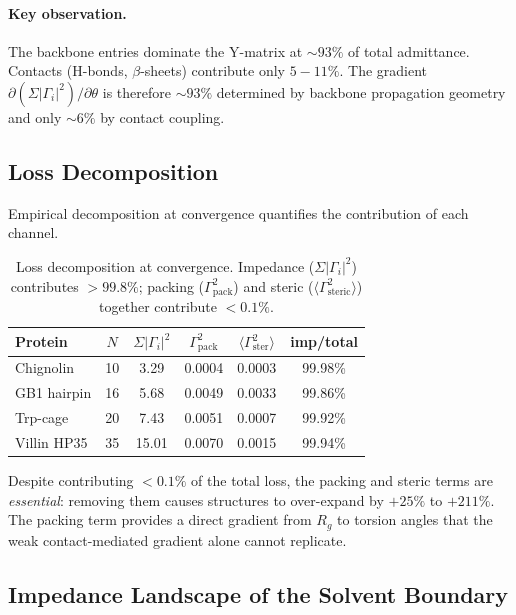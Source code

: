 \paragraph{Key observation.}
The backbone entries dominate the Y-matrix at $\sim\!93\%$ of total
admittance.  Contacts (H-bonds, $\beta$-sheets) contribute only $5{-}11\%$.
The gradient $\partial(\Sigma|\Gamma_i|^2)/\partial\theta$ is therefore
$\sim\!93\%$ determined by backbone propagation geometry and only $\sim\!6\%$ by
contact coupling.

\subsection{Loss Decomposition}
\label{sec:loss_decomp}

Empirical decomposition at convergence quantifies the contribution of
each channel.

\begin{table}[H]
\centering
\caption{Loss decomposition at convergence.  Impedance
($\Sigma|\Gamma_i|^2$) contributes $>99.8\%$; packing
($\Gamma_\text{pack}^2$) and steric
($\langle\Gamma_\text{steric}^2\rangle$) together contribute
$<0.1\%$.}
\label{tab:loss_decomp}
\small
\begin{tabular}{@{}l c c c c c@{}}
\toprule
\textbf{Protein} & $N$ & $\Sigma|\Gamma_i|^2$ & $\Gamma_\text{pack}^2$ & $\langle\Gamma^2_\text{ster}\rangle$ & imp/total \\
\midrule
Chignolin   & 10 & 3.29  & 0.0004 & 0.0003 & 99.98\% \\
GB1 hairpin & 16 & 5.68  & 0.0049 & 0.0033 & 99.86\% \\
Trp-cage    & 20 & 7.43  & 0.0051 & 0.0007 & 99.92\% \\
Villin HP35 & 35 & 15.01 & 0.0070 & 0.0015 & 99.94\% \\
\bottomrule
\end{tabular}
\end{table}

Despite contributing $<0.1\%$ of the total loss, the packing and
steric terms are \emph{essential}: removing them causes structures to
over-expand by $+25\%$ to $+211\%$.  The packing term provides a
direct gradient from $R_g$ to torsion angles that the weak
contact-mediated gradient alone cannot replicate.

\subsection{Impedance Landscape of the Solvent Boundary}
\label{sec:impedance_landscape}

